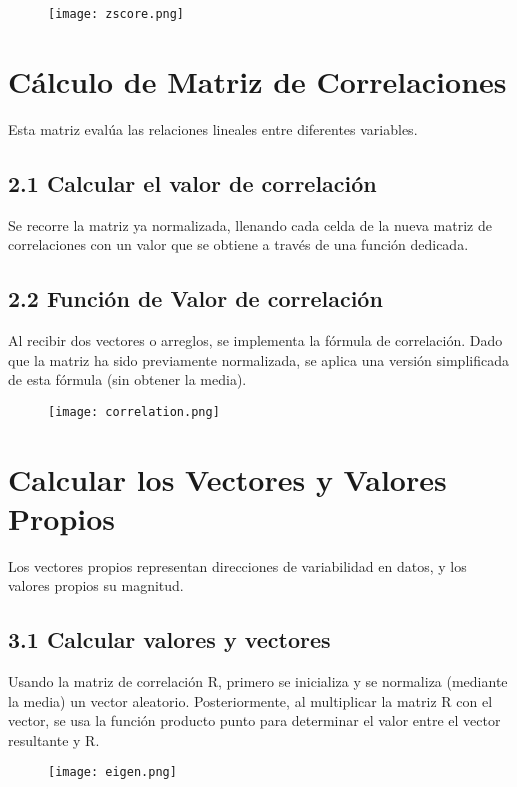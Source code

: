\documentclass{article}
\begin{document}
\begin{figure}[h]
    \centering
    \texttt{[image: zscore.png]}
    \label{fig:my_label}
\end{figure}

\section{ Cálculo de Matriz de Correlaciones} Esta matriz evalúa las relaciones lineales entre diferentes variables.

\subsection*{2.1 Calcular el valor de correlación}
Se recorre la matriz ya normalizada, llenando cada celda de la nueva matriz de correlaciones con un valor que se obtiene a través de una función dedicada.

\subsection*{2.2 Función de Valor de correlación}
Al recibir dos vectores o arreglos, se implementa la fórmula de correlación. Dado que la matriz ha sido previamente normalizada, se aplica una versión simplificada de esta fórmula (sin obtener la media).

\begin{figure}[h]
    \centering
    \texttt{[image: correlation.png]}
    \label{fig:my_label}
\end{figure}

\section{ Calcular los Vectores y Valores Propios} Los vectores propios representan direcciones de variabilidad en datos, y los valores propios su magnitud.

\subsection*{3.1 Calcular valores y vectores}
Usando la matriz de correlación R, primero se inicializa y se normaliza (mediante la media) un vector aleatorio. Posteriormente, al multiplicar la matriz R con el vector, se usa la función producto punto para determinar el valor entre el vector resultante y R.

\begin{figure}[h]
    \centering
    \texttt{[image: eigen.png]}
    \label{fig:my_label}
\end{figure}
\end{document}
